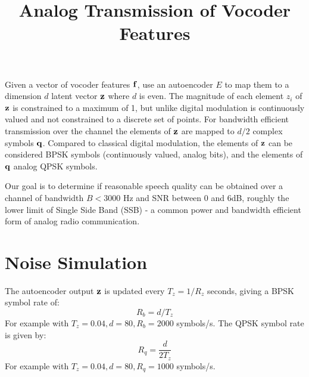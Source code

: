 \documentclass{article}
\begin{document}
\title{Analog Transmission of Vocoder Features}
\maketitle

Given a vector of vocoder features $\bf{f}$, use an autoencoder $E$ to map them to a dimension $d$ latent vector $\bf{z}$ where $d$ is even.  The magnitude of each element $z_i$ of $\bf{z}$ is constrained to a maximum of 1, but unlike digital modulation is continuously valued and not constrained to a discrete set of points. For bandwidth efficient transmission over the channel the elements of $\bf{z}$ are mapped to $d/2$ complex symbols $\bf{q}$. Compared to classical digital modulation, the elements of $\bf{z}$ can be considered BPSK symbols (continuously valued, analog bits), and the elements of $\bf{q}$ analog QPSK symbols.

Our goal is to determine if reasonable speech quality can be obtained over a channel of bandwidth $B<3000$ Hz and SNR between 0 and 6dB, roughly the lower limit of Single Side Band (SSB) - a common power and bandwidth efficient form of analog radio communication.

\section{Noise Simulation}

The autoencoder output $\bf{z}$ is updated every $T_z=1/R_z$ seconds, giving a BPSK symbol rate of:
\begin{equation}
R_b=d/T_z
\end{equation}
For example with $T_z=0.04, d=80, R_b=2000$ symbols/s.  The QPSK symbol rate is given by:
\begin{equation}
R_q = \frac{d}{2T_z} 
\end{equation}
For example with $T_z=0.04, d=80, R_q=1000$ symbols/s.
\end{document}
